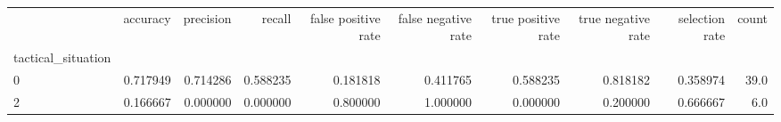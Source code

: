 \begin{tabular}{lrrrrrrrrr}
\toprule
{} &  accuracy &  precision &    recall &  false positive rate &  false negative rate &  true positive rate &  true negative rate &  selection rate &  count \\
tactical\_situation &           &            &           &                      &                      &                     &                     &                 &        \\
\midrule
0                  &  0.717949 &   0.714286 &  0.588235 &             0.181818 &             0.411765 &            0.588235 &            0.818182 &        0.358974 &   39.0 \\
2                  &  0.166667 &   0.000000 &  0.000000 &             0.800000 &             1.000000 &            0.000000 &            0.200000 &        0.666667 &    6.0 \\
\bottomrule
\end{tabular}
